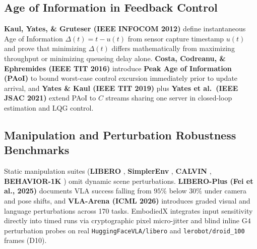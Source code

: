\documentclass[10pt,letterpaper]{article}
\begin{document}
\subsection{Age of Information in Feedback Control}
\textbf{Kaul, Yates, \& Gruteser (IEEE INFOCOM 2012)} \cite{Kaul2012realtime} define instantaneous Age of Information $\Delta(t) = t - u(t)$ from sensor capture timestamp $u(t)$ and prove that minimizing $\Delta(t)$ differs mathematically from maximizing throughput or minimizing queueing delay alone. \textbf{Costa, Codreanu, \& Ephremides (IEEE TIT 2016)} \cite{Costa2016age} introduce \textbf{Peak Age of Information (PAoI)} to bound worst-case control excursion immediately prior to update arrival, and \textbf{Yates \& Kaul (IEEE TIT 2019)} \cite{Yates2019age} plus \textbf{Yates et al.\ (IEEE JSAC 2021)} \cite{Yates2021age} extend PAoI to $C$ streams sharing one server in closed-loop estimation and LQG control.

\subsection{Manipulation and Perturbation Robustness Benchmarks}
Static manipulation suites (\textbf{LIBERO} \cite{Liu2023libero}, \textbf{SimplerEnv} \cite{Li2024evaluating}, \textbf{CALVIN} \cite{Mees2022calvin}, \textbf{BEHAVIOR-1K} \cite{Stanford2026behavior}) omit dynamic scene perturbations. \textbf{LIBERO-Plus (Fei et al., 2025)} \cite{Fei2025liberoplus} documents VLA success falling from $95\%$ below $30\%$ under camera and pose shifts, and \textbf{VLA-Arena (ICML 2026)} \cite{Zhang2025vlaarena} introduces graded visual and language perturbations across 170 tasks. EmbodiedX integrates input sensitivity directly into timed runs via cryptographic pixel micro-jitter and blind inline $\text{G4}$ perturbation probes on real \texttt{HuggingFaceVLA/libero} and \texttt{lerobot/droid\_100} frames (D10).
\end{document}
